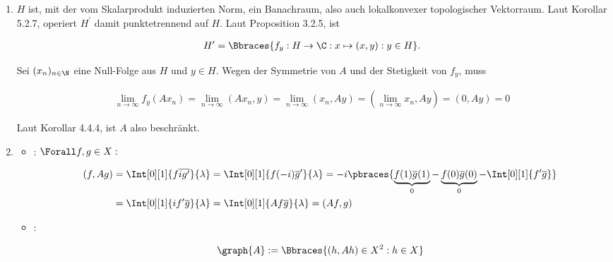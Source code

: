 \begin{solution}

\phantom{}

\begin{enumerate}

  \item
  $H$ ist, mit der vom Skalarprodukt induzierten Norm, ein Banachraum, also auch lokalkonvexer topologischer Vektorraum.
  Laut Korollar 5.2.7, operiert $H^\prime$ damit punktetrennend auf $H$.
  Laut Proposition 3.2.5, ist

  \begin{align*}
    H^\prime
    =
    \Bbraces
    {
      f_y:
      H \to \C:
      x \mapsto (x, y):
      y \in H
    }.
  \end{align*}

  Sei $(x_n)_{n \in \N}$ eine Null-Folge aus $H$ und $y \in H$.
  Wegen der Symmetrie von $A$ und der Stetigkeit von $f_y$, muss

  \begin{align*}
    \lim_{n \to \infty} f_y(A x_n)
    =
    \lim_{n \to \infty} (A x_n, y)
    =
    \lim_{n \to \infty} (x_n, A y)
    =
    (\lim_{n \to \infty} x_n, A y)
    =
    (0, A y) = 0
  \end{align*}

  Laut Korollar 4.4.4, ist $A$ also beschränkt.


  \item
  \begin{itemize}

    \item
    :
    $\Forall f, g \in X:$

    \begin{align*}
      (f, A g)
      & =
      \Int[0][1]{f \overline{i g^\prime}}{\lambda}
      =
      \Int[0][1]{f (-i) \overline{g}^\prime}{\lambda}
      =
      -i \pbraces
      {
        \underbrace{f(1) \overline{g}(1)}_0 -
        \underbrace{f(0) \overline{g}(0)}_0 -
        \Int[0][1]{f^\prime \overline{g}}
      } \\
      & =
      \Int[0][1]{i f^\prime \overline{g}}{\lambda}
      =
      \Int[0][1]{A f \overline{g}}{\lambda}
      =
      (A f, g)
    \end{align*}

    \item
    :

    \begin{align*}
      \graph{A} :=
      \Bbraces
      {
        (h, A h) \in X^2:
        h \in X
      }
    \end{align*}


\end{itemize}
\end{enumerate}
\end{solution}
